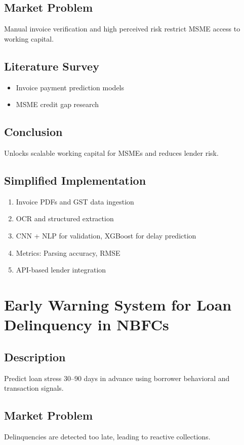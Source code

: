 \documentclass[11pt,a4paper]{article}
\begin{document}
\subsection*{Market Problem}
Manual invoice verification and high perceived risk restrict MSME access to working capital.

\subsection*{Literature Survey}
\begin{itemize}[noitemsep]
    \item Invoice payment prediction models
    \item MSME credit gap research
\end{itemize}

\subsection*{Conclusion}
Unlocks scalable working capital for MSMEs and reduces lender risk.

\subsection*{Simplified Implementation}
\begin{enumerate}[noitemsep]
    \item Invoice PDFs and GST data ingestion
    \item OCR and structured extraction
    \item CNN + NLP for validation, XGBoost for delay prediction
    \item Metrics: Parsing accuracy, RMSE
    \item API-based lender integration
\end{enumerate}

\section{Early Warning System for Loan Delinquency in NBFCs}

\subsection*{Description}
Predict loan stress 30–90 days in advance using borrower behavioral and transaction signals.

\subsection*{Market Problem}
Delinquencies are detected too late, leading to reactive collections.
\end{document}
